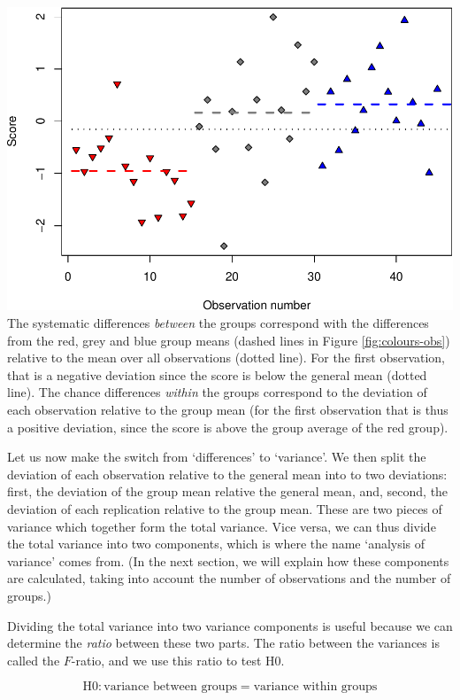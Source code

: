 \documentclass[
]{book}
\begin{document}
\includegraphics{QMS-EN_files/figure-latex/colours-obs-1.pdf}
The systematic differences \emph{between} the groups correspond with the
differences from the red, grey and blue group means
(dashed lines in Figure \ref{fig:colours-obs}) relative to the mean over
all observations (dotted line). For the first observation, that is a
negative deviation since the score is below the general mean
(dotted line). The chance differences \emph{within} the groups
correspond to the deviation of each observation relative to the
group mean (for the first observation that is thus a positive
deviation, since the score is above the group average of the red
group).

Let us now make the switch from `differences' to `variance'. We then split
the deviation of each observation relative to the general
mean into to two deviations: first, the deviation of the group
mean relative the general mean, and, second, the deviation of
each replication relative to the group mean. These are two pieces of variance
which together form the total variance. Vice versa, we can thus divide
the total variance into two components, which is where the name
`analysis of variance' comes from. (In the next section, we will explain
how these components are calculated, taking into account the number of
observations and the number of groups.)

Dividing the total variance into two variance components is
useful because we can determine the \emph{ratio} between these two parts.
The ratio between the variances is called the \(F\)-ratio, and we use
this ratio to test H0.

\[\textrm{H0}: \textrm{variance between groups} = \textrm{variance within groups}\]
\end{document}
